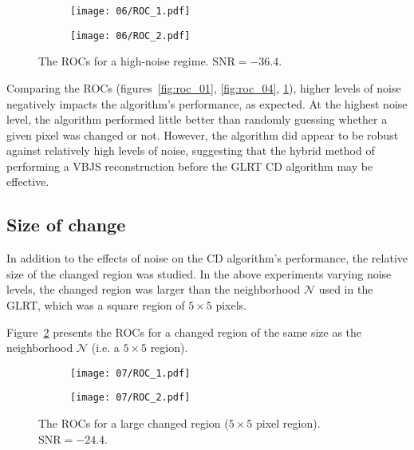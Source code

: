 \documentclass{article}
\begin{document}
\begin{figure}[H]
   \centering
   \begin{subfigure}{0.5\textwidth}
       \centering
       \texttt{[image: 06/ROC\_1.pdf]}
   \end{subfigure}%
   \begin{subfigure}{0.5\textwidth}
       \centering
       \texttt{[image: 06/ROC\_2.pdf]}
   \end{subfigure}%
   \caption{The ROCs for a high-noise regime. $\text{SNR} = -36.4$.}
   \label{fig:roc_06}
\end{figure}

Comparing the ROCs (figures~\ref{fig:roc_01}, \ref{fig:roc_04}, \ref{fig:roc_06}), higher levels of noise negatively impacts the algorithm's performance, as expected. At the highest noise level, the algorithm performed little better than randomly guessing whether a given pixel was changed or not. However, the algorithm did appear to be robust against relatively high levels of noise, suggesting that the hybrid method of performing a VBJS reconstruction before the GLRT CD algorithm may be effective.

\subsection{Size of change}

In addition to the effects of noise on the CD algorithm's performance, the relative size of the changed region was studied. In the above experiments varying noise levels, the changed region was larger than the neighborhood $\mathcal{N}$ used in the GLRT, which was a square region of $5 \times 5$ pixels.

Figure~\ref{fig:roc_07} presents the ROCs for a changed region of the same size as the neighborhood $\mathcal{N}$ (i.e. a $5\times 5$ region).

\begin{figure}[H]
   \centering
   \begin{subfigure}{0.5\textwidth}
       \centering
       \texttt{[image: 07/ROC\_1.pdf]}
   \end{subfigure}%
   \begin{subfigure}{0.5\textwidth}
       \centering
       \texttt{[image: 07/ROC\_2.pdf]}
   \end{subfigure}%
   \caption{The ROCs for a large changed region ($5\times 5$ pixel region). $\text{SNR} = -24.4$.}
   \label{fig:roc_07}
\end{figure}
\end{document}
